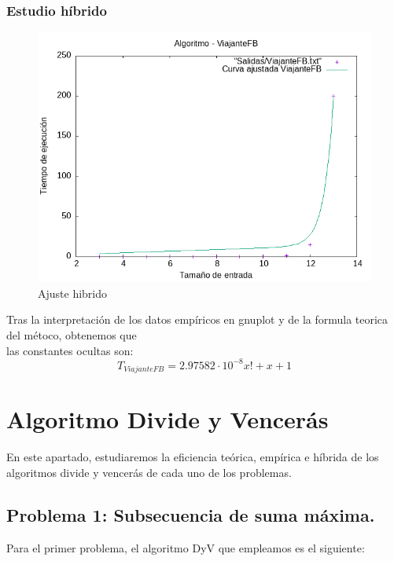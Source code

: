 \documentclass[11pt,openany]{book}
\begin{document}
\subsection{Estudio híbrido}
\begin{center}
      \begin{figure}[H]
                  \centering
                  \includegraphics[width=0.7\linewidth]{assets/Img/ViajanteFB_hib.png}
                  \caption{Ajuste hibrido}
                  \label{fig:ViajanteFBhibrido}
      \end{figure}
\end{center}
Tras la interpretación de los datos empíricos en gnuplot y de la formula teorica del métoco, obtenemos que \\
las constantes ocultas son:
\begin{equation*}
      T_{ViajanteFB}=2.97582 \cdot 10^{-8}x!+x+1
\end{equation*}



\chapter{Algoritmo Divide y Vencerás}
En este apartado, estudiaremos la eficiencia teórica, empírica e híbrida de los algoritmos divide y vencerás
de cada uno de los problemas.
\section{Problema 1: Subsecuencia de suma máxima.}
Para el primer problema, el algoritmo DyV que empleamos es el siguiente:
\end{document}
